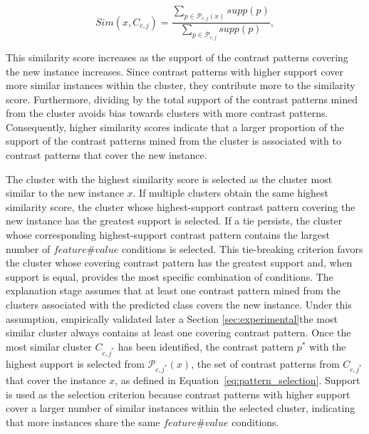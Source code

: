       \begin{equation}
       	Sim(x, C_{c,j})
       	=
       	\frac{
       		\sum\limits_{p \in \mathcal{P}_{c,j}(x)} supp(p)
       	}{
       		\sum\limits_{p \in \mathcal{P}_{c,j}} supp(p)
       	},
       	\label{eq:cluster_similarity}
       \end{equation}
       
       This similarity score increases as the support of the contrast patterns covering the new instance increases. Since contrast patterns with higher support cover more similar instances within the cluster, they contribute more to the similarity score. Furthermore, dividing by the total support of the contrast patterns mined from the cluster avoids bias towards clusters with more contrast patterns. Consequently, higher similarity scores indicate that a larger proportion of the support of the contrast patterns mined from the cluster is associated with to contrast patterns that cover the new instance.\newline
       
{\color{blue}		       
		The cluster with the highest similarity score is selected as the cluster most similar to the new instance $x$. If multiple clusters obtain the same highest similarity score, the cluster whose highest-support contrast pattern covering the new instance has the greatest support is selected. If a tie persists, the cluster whose corresponding highest-support contrast pattern contains the largest number of $feature\#value$ conditions is selected. This tie-breaking criterion favors the cluster whose covering contrast pattern has the greatest support and, when support is equal, provides the most specific combination of conditions. The explanation stage assumes that at least one contrast pattern mined from the clusters associated with the predicted class covers the new instance. Under this assumption, empirically validated later a Section \ref{sec:experimental}the most similar cluster always contains at least one covering contrast pattern. Once the most similar cluster $C_{c,j^*}$ has been identified, the contrast pattern $p^*$ with the highest support is selected from $\mathcal{P}_{c,j^*}(x)$, the set of contrast patterns from $C_{c,j^*}$ that cover the instance $x$, as defined in Equation~\ref{eq:pattern_selection}. Support is used as the selection criterion because contrast patterns with higher support cover a larger number of similar instances within the selected cluster, indicating that more instances share the same $feature\#value$ conditions.
	}
       
